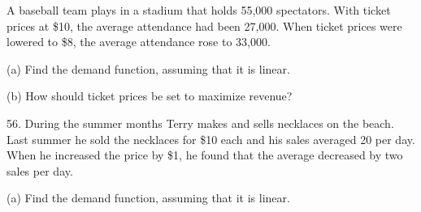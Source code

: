 \documentclass{sebase}
\begin{document}
\begin{multicols}{2}
\begin{ExerciseList}
\begin{ExerciseList}
%
\end{ExerciseList}

\item[{\hfill {\protect\fbox{\hspace{-2pt}55.\hspace{-2pt}}}}] A baseball
team plays in a stadium that holds 55,000 spectators. With ticket prices at
\$10, the average attendance had been 27,000. When ticket prices were
lowered to \$8, the average attendance rose to 33,000.

\begin{ExerciseList}
\item[(a)] Find the demand function, assuming that it is linear.

%

%

\item[(b)] How should ticket prices be set to maximize revenue?

%

%
\end{ExerciseList}

\item[\hfill 56.] During the summer months Terry makes and sells necklaces
on the beach. Last summer he sold the necklaces for \$10 each and his sales
averaged 20 per day. When he increased the price by \$1, he found that the
average decreased by two sales per day.

\begin{ExerciseList}
\item[(a)] Find the demand function, assuming that it is linear.


\end{ExerciseList}
\end{ExerciseList}
\end{multicols}
\end{document}
